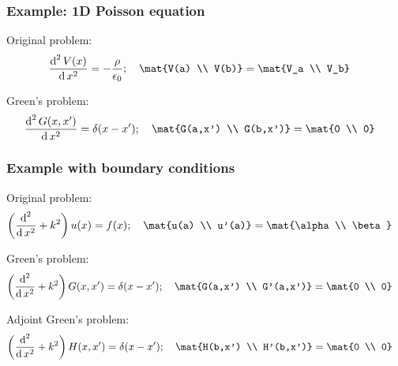 \documentclass[12 pt, compress, handout, intlimits]{beamer}
\renewcommand{\d}{\operatorname{d}}
\begin{document}
\begin{frame}[fragile]
    \frametitle{Example: 1D Poisson equation}

    Original problem:
    \begin{align*}
        \frac{\d^2 V(x)}{\d x^2} &= - \frac{\rho}{\epsilon_0}; \quad \mat{V(a) \\ V(b)} = \mat{V_a \\ V_b}
    \end{align*}
    
    Green's problem:
    \begin{align*}
        \frac{\d^2 G(x,x')}{\d x^2} &= \delta(x - x'); \quad \mat{G(a,x') \\ G(b,x')} = \mat{0 \\ 0}
    \end{align*}
    
    
\end{frame}

\note{}


\begin{frame}[fragile]
    \frametitle{Example with boundary conditions}

    Original problem:
    \begin{align*}
        \left( \frac{\d^2}{\d x^2} + k^2 \right) u(x) &= f(x); \quad \mat{u(a) \\ u'(a)} = \mat{\alpha \\ \beta}
    \end{align*}

    Green's problem:
    \begin{align*}
        \left( \frac{\d^2}{\d x^2} + k^2 \right) G(x,x') &= \delta(x - x'); \quad \mat{G(a,x') \\ G'(a,x')} = \mat{0 \\ 0}
    \end{align*}

    Adjoint Green's problem:
    \begin{align*}
        \left( \frac{\d^2}{\d x^2} + k^2 \right) H(x,x') &= \delta(x - x'); \quad \mat{H(b,x') \\ H'(b,x')} = \mat{0 \\ 0}
    \end{align*}
    
\end{frame}

\end{document}
